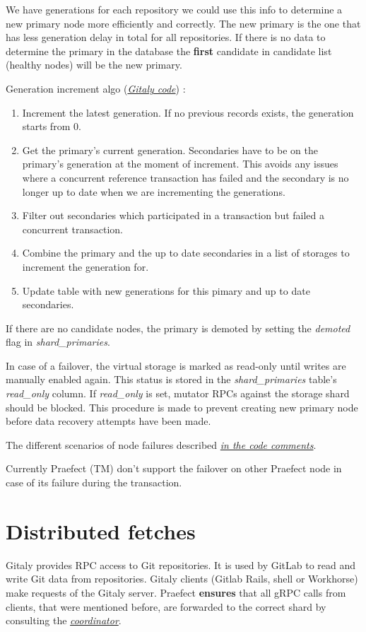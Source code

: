 \documentclass[acmlarge, screen, nonacm]{acmart}
\begin{document}
We have generations for each repository we could use this info to determine a new primary node more efficiently and correctly. 
The new primary is the one that has less generation delay in total for all repositories. If there is no data to determine the 
primary in the database the \textbf{first} candidate in candidate list (healthy nodes) will be the new primary.

Generation increment algo (\emph{\href{https://gitlab.com/gitlab-org/gitaly/-/blob/master/internal/praefect/datastore/repository_store.go}{Gitaly code}}) :
\begin{enumerate}
\item Increment the latest generation. If no previous records exists, the generation starts from 0.
\item Get the primary's current generation. Secondaries have to be on the primary's generation at the moment of increment. 
This avoids any issues where a concurrent reference transaction has failed and the secondary is no longer up to date when 
we are incrementing the generations.
\item Filter out secondaries which participated in a transaction but failed a concurrent transaction.
\item Combine the primary and the up to date secondaries in a list of storages to increment the generation for.
\item Update table with new generations for this pimary and up to date secondaries.
 \end{enumerate}
If there are no candidate nodes, the primary is demoted by setting the \textit{demoted} flag in \textit{shard\_primaries}.

In case of a failover, the virtual storage is marked as read-only until writes are manually enabled
again. This status is stored in the \textit{shard\_primaries} table's \textit{read\_only }column. 
If \textit{read\_only } is set, mutator RPCs against the storage shard should be blocked. This procedure is made 
to prevent creating new primary node before data recovery attempts have been made.

The different scenarios of node failures described \emph{\href{https://gitlab.com/gitlab-org/gitaly/-/blob/master/internal/praefect/nodes/sql_elector.go\#L401}{in the code comments}}.

Currently Praefect (TM) don't support the failover on other Praefect node in case of its failure during the transaction.

\section{Distributed fetches}
Gitaly provides RPC access to Git repositories. It is used by GitLab to read and write Git data from repositories.
Gitaly clients (Gitlab Rails, shell or Workhorse) make requests of the Gitaly server.  Praefect \textbf{ensures} 
that all gRPC calls from clients, that were mentioned before, are forwarded to the correct shard by consulting the
\emph{\href{https://gitlab.com/gitlab-org/gitaly/-/blob/master/internal/praefect/coordinator.go}{coordinator}}.
\end{document}
